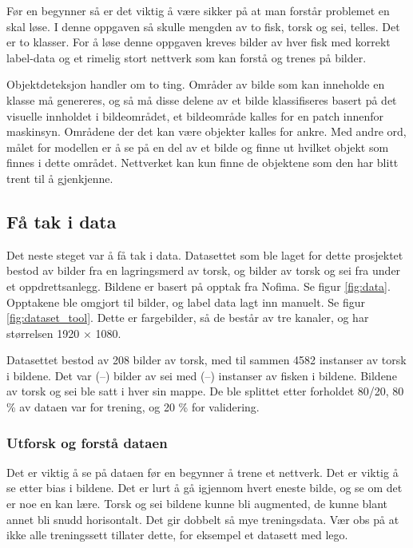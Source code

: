 Før en begynner så er det viktig å være sikker på at man forstår problemet en skal løse. I denne oppgaven så skulle mengden av to fisk, torsk og sei, telles. Det er to klasser. For å løse denne oppgaven kreves bilder av hver fisk med korrekt label-data og et rimelig stort nettverk som kan forstå og trenes på bilder.

Objektdeteksjon handler om to ting. Områder av bilde som kan inneholde en klasse må genereres, og så må disse delene av et bilde klassifiseres basert på det visuelle innholdet i bildeområdet, et bildeområde kalles for en patch innenfor maskinsyn. Områdene der det kan være objekter kalles for ankre. Med andre ord, målet for modellen er å se på en del av et bilde og finne ut hvilket objekt som finnes i dette området. Nettverket kan kun finne de objektene som den har blitt trent til å gjenkjenne.

\subsection{Få tak i data}

Det neste steget var å få tak i data. Datasettet som ble laget for dette prosjektet bestod av bilder fra en lagringsmerd av torsk, og bilder av torsk og sei fra under et oppdrettsanlegg. Bildene er basert på opptak fra Nofima. Se figur \ref{fig:data}. Opptakene ble omgjort til bilder, og label data lagt inn manuelt. Se figur \ref{fig:dataset_tool}. Dette er fargebilder, så de består av tre kanaler, og har størrelsen 1920 $\times$ 1080. %

Datasettet bestod av 208 bilder av torsk, med til sammen 4582 instanser av torsk i bildene. Det var (--) bilder av sei med (--) instanser av fisken i bildene. Bildene av torsk og sei ble satt i hver sin mappe. De ble splittet etter forholdet 80/20, 80 \% av dataen var for trening, og 20 \% for validering.

\subsubsection{Utforsk og forstå dataen}

Det er viktig å se på dataen før en begynner å trene et nettverk. Det er viktig å se etter bias i bildene. Det er lurt å gå igjennom hvert eneste bilde, og se om det er noe en kan lære. Torsk og sei bildene kunne bli augmented, de kunne blant annet bli snudd horisontalt. Det gir dobbelt så mye treningsdata. Vær obs på at ikke alle treningssett tillater dette, for eksempel et datasett med lego.

